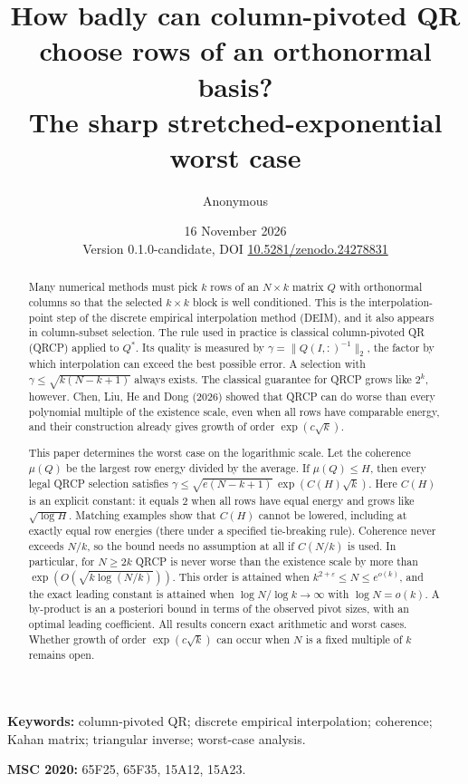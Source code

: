 \documentclass[11pt,a4paper]{article}
\title{How badly can column-pivoted QR choose rows of an orthonormal basis?\\[2pt]
\large The sharp stretched-exponential worst case}
\author{Anonymous}
\date{16 November 2026\\[2pt]\small Version 0.1.0-candidate, DOI \href{https://doi.org/10.5281/zenodo.24278831}{10.5281/zenodo.24278831}}
\theoremstyle{definition}
\numberwithin{equation}{section}
\begin{document}
\maketitle

\begin{abstract}
Many numerical methods must pick $k$ rows of an $N\times k$ matrix $Q$ with orthonormal columns so that the
selected $k\times k$ block is well conditioned. This is the interpolation-point step of the discrete empirical
interpolation method (DEIM), and it also appears in column-subset selection. The rule used
in practice is classical column-pivoted QR (QRCP) applied to $Q^*$. Its quality is measured by
$\gamma=\|Q(I,:)^{-1}\|_2$, the factor by which interpolation can exceed the best possible error. A selection with
$\gamma\le\sqrt{k(N-k+1)}$ always exists. The classical guarantee for QRCP grows like $2^k$, however. Chen, Liu, He
and Dong (2026) showed that QRCP can do worse than every polynomial multiple of the existence scale, even when all
rows have comparable energy, and their construction already gives growth of order $\exp(c\sqrt k)$.

This paper determines the worst case on the logarithmic scale. Let the coherence $\mu(Q)$ be the largest row energy
divided by the average. If $\mu(Q)\le H$, then every legal QRCP selection satisfies
$\gamma\le\sqrt{e(N-k+1)}\,\exp(C(H)\sqrt k)$. Here $C(H)$ is an explicit constant: it equals $2$ when all rows
have equal energy and grows like $\sqrt{\log H}$. Matching examples show that $C(H)$ cannot be lowered, including at
exactly equal row energies (there under a specified tie-breaking rule). Coherence never exceeds $N/k$, so the bound needs no assumption at all if $C(N/k)$ is
used. In particular, for $N\ge2k$ QRCP is never worse than the existence scale by more than
$\exp(O(\sqrt{k\log(N/k)}))$. This order is attained when $k^{2+\varepsilon}\le N\le e^{o(k)}$, and the exact leading
constant is attained when $\log N/\log k\to\infty$ with $\log N=o(k)$. A by-product is an a posteriori bound in terms of the
observed pivot sizes, with an optimal leading coefficient. All results concern exact arithmetic and worst cases.
Whether growth of order $\exp(c\sqrt k)$ can occur when $N$ is a fixed multiple of $k$ remains open.
\end{abstract}

\noindent\textbf{Keywords:} column-pivoted QR; discrete empirical interpolation; coherence; Kahan matrix;
triangular inverse; worst-case analysis.

\noindent\textbf{MSC 2020:} 65F25, 65F35, 15A12, 15A23.
\end{document}
